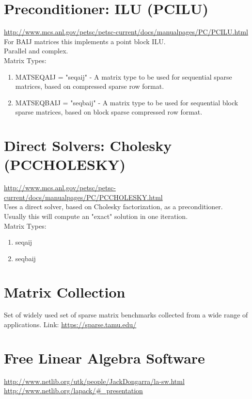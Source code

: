 \documentclass[]{scrartcl}
\begin{document}
{\section{Preconditioner: ILU (PCILU)}
\url{http://www.mcs.anl.gov/petsc/petsc-current/docs/manualpages/PC/PCILU.html} \\
For BAIJ matrices this implements a point block ILU. \\
Parallel and complex.\\
Matrix Types:
\begin{enumerate}
	\item MATSEQAIJ = "seqaij" - A matrix type to be used for sequential sparse matrices, based on compressed sparse row format.
	\item MATSEQBAIJ = "seqbaij" - A matrix type to be used for sequential block sparse matrices, based on block sparse compressed row format.
\end{enumerate}
\section{Direct Solvers: Cholesky (PCCHOLESKY)}
\url{http://www.mcs.anl.gov/petsc/petsc-current/docs/manualpages/PC/PCCHOLESKY.html} \\
Uses a direct solver, based on Cholesky factorization, as a preconditioner. \\ 
Usually this will compute an "exact" solution in one iteration. \\
Matrix Types:
\begin{enumerate}
	\item seqaij
	\item seqbaij
\end{enumerate}

\section{Matrix Collection}
Set of widely used set of sparse matrix benchmarks collected from a wide range of applications.
Link:
\url{https://sparse.tamu.edu/} \\
	
\section{Free Linear Algebra Software}
\url{http://www.netlib.org/utk/people/JackDongarra/la-sw.html} \\
\url{http://www.netlib.org/lapack/\#_presentation} \\
	
}
\end{document}
